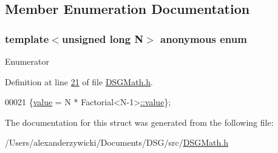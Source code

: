 \subsection{Member Enumeration Documentation}
\hypertarget{struct_d_s_g_1_1_factorial_a2443a477420ba8fc5494b186a58dcacc}{\subsubsection[{anonymous enum}]{\setlength{\rightskip}{0pt plus 5cm}template$<$unsigned long N$>$ anonymous enum}}\label{struct_d_s_g_1_1_factorial_a2443a477420ba8fc5494b186a58dcacc}
\begin{Desc}
\item[Enumerator]\par
\begin{description}
\item[{\em 
\hypertarget{struct_d_s_g_1_1_factorial_a2443a477420ba8fc5494b186a58dcaccaebc078d57d6fc1fbd5953d284c9cde04}{value}\label{struct_d_s_g_1_1_factorial_a2443a477420ba8fc5494b186a58dcaccaebc078d57d6fc1fbd5953d284c9cde04}
}]\end{description}
\end{Desc}


Definition at line \hyperlink{_d_s_g_math_8h_source_l00021}{21} of file \hyperlink{_d_s_g_math_8h_source}{D\+S\+G\+Math.\+h}.


\begin{DoxyCode}
00021 \{\hyperlink{struct_d_s_g_1_1_factorial_a2443a477420ba8fc5494b186a58dcaccaebc078d57d6fc1fbd5953d284c9cde04}{value} = N * Factorial<N-1>\hyperlink{struct_d_s_g_1_1_factorial_a2443a477420ba8fc5494b186a58dcaccaebc078d57d6fc1fbd5953d284c9cde04}{::value}\};
\end{DoxyCode}


The documentation for this struct was generated from the following file\+:\begin{DoxyCompactItemize}
\item 
/\+Users/alexanderzywicki/\+Documents/\+D\+S\+G/src/\hyperlink{_d_s_g_math_8h}{D\+S\+G\+Math.\+h}\end{DoxyCompactItemize}
